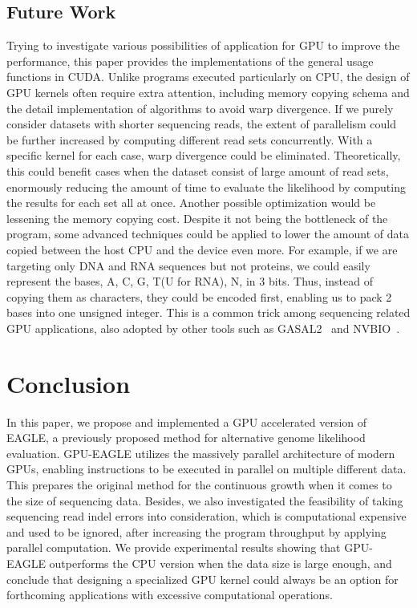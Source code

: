 \documentclass{PHlab-thesis}
\begin{document}
\section{Future Work}
Trying to investigate various possibilities of application for GPU to improve the performance, this paper provides the implementations of the general usage functions in CUDA. Unlike programs executed particularly on CPU, the design of GPU kernels often require extra attention, including memory copying schema and the detail implementation of algorithms to avoid warp divergence. If we purely consider datasets with shorter sequencing reads, the extent of parallelism could be further increased by computing different read sets concurrently. With a specific kernel for each case, warp divergence could be eliminated. Theoretically, this could benefit cases when the dataset consist of large amount of read sets, enormously reducing the amount of time to evaluate the likelihood by computing the results for each set all at once. Another possible optimization would be lessening the memory copying cost. Despite it not being the bottleneck of the program, some advanced techniques could be applied to lower the amount of data copied between the host CPU and the device even more. For example, if we are targeting only DNA and RNA sequences but not proteins, we could easily represent the bases, A, C, G, T(U for RNA), N, in 3 bits. Thus, instead of copying them as characters, they could be encoded first, enabling us to pack 2 bases into one unsigned integer. This is a common trick among sequencing related GPU applications, also adopted by other tools such as GASAL2~\cite{ahmed2019gasal2} and NVBIO~\cite{nvbio2015}.

\chapter{Conclusion}
In this paper, we propose and implemented a GPU accelerated version of EAGLE, a previously proposed method for alternative genome likelihood evaluation. GPU-EAGLE utilizes the massively parallel architecture of modern GPUs, enabling instructions to be executed in parallel on multiple different data. This prepares the original method for the continuous growth when it comes to the size of sequencing data. Besides, we also investigated the feasibility of taking sequencing read indel errors into consideration, which is computational expensive and used to be ignored, after increasing the program throughput by applying parallel computation. We provide experimental results showing that GPU-EAGLE outperforms the CPU version when the data size is large enough, and conclude that designing a specialized GPU kernel could always be an option for forthcoming applications with excessive computational operations.

\newpage
{}
\printbibliography
\end{document}
